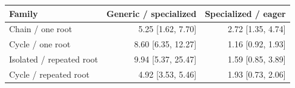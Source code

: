 \begin{tabular}{lrr}
\toprule
Family & Generic / specialized & Specialized / eager \\
\midrule
Chain / one root & 5.25 [1.62, 7.70] & 2.72 [1.35, 4.74] \\
Cycle / one root & 8.60 [6.35, 12.27] & 1.16 [0.92, 1.93] \\
Isolated / repeated root & 9.94 [5.37, 25.47] & 1.59 [0.85, 3.89] \\
Cycle / repeated root & 4.92 [3.53, 5.46] & 1.93 [0.73, 2.06] \\
\bottomrule
\end{tabular}
